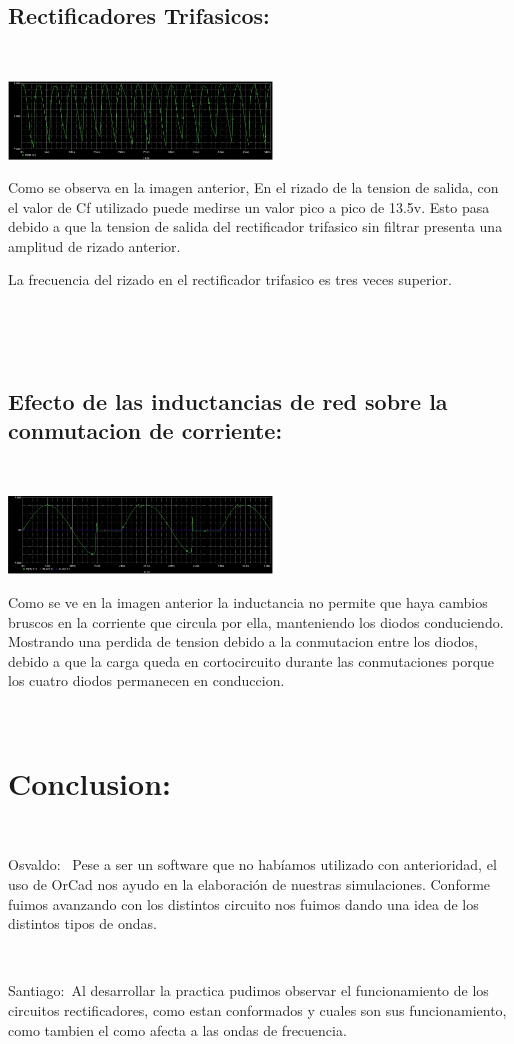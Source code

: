 \documentclass[12pt,letterpaper]{article}
\begin{document}
\

\

\subsection{Rectificadores Trifasicos:}
 \
 
\includegraphics[width=7cm]{Resultado Circuito 1-6.png}  
 \

Como se observa en la imagen anterior, En el rizado de la tension de salida, con el valor de Cf utilizado puede medirse un valor pico a pico de 13.5v.
Esto pasa debido a que la tension de salida del rectificador trifasico sin filtrar presenta una amplitud de rizado anterior.
\

La frecuencia del rizado en el rectificador trifasico es tres veces superior.

\

\

\subsection{Efecto de las inductancias de red sobre la conmutacion de corriente: }
\

\includegraphics[width=7cm]{Resultado Circuito 1-7.png} 
\

Como se ve en la imagen anterior la inductancia no permite que haya cambios bruscos en la corriente que circula por ella, manteniendo los diodos conduciendo. Mostrando una perdida de tension debido a la conmutacion entre los diodos, debido a que la carga queda en cortocircuito durante las conmutaciones porque los cuatro diodos permanecen en conduccion.

\

\section{Conclusion:}
 \
 
 Osvaldo: \ Pese a ser un software que no habíamos utilizado con anterioridad, el uso de OrCad nos ayudo en la elaboración de nuestras simulaciones. Conforme fuimos avanzando con los distintos circuito nos fuimos dando una idea de los distintos tipos de ondas.
 \
 
 \

Santiago:\ Al desarrollar la practica pudimos observar el funcionamiento de los circuitos rectificadores, como estan conformados y cuales son sus funcionamiento, como tambien el como afecta a las ondas de frecuencia.
 
\end{document}

